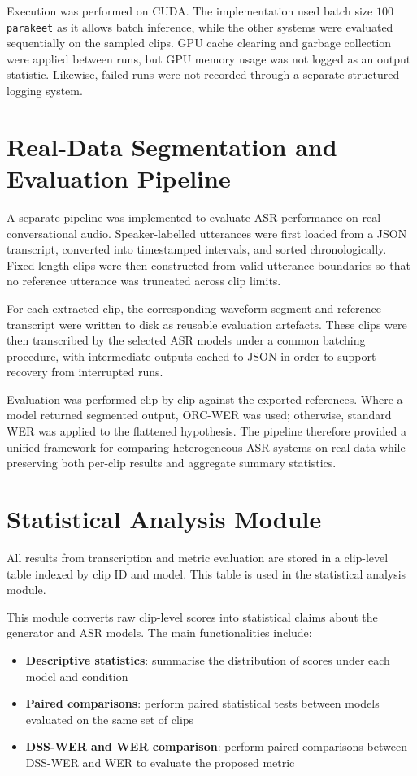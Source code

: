 Execution was performed on CUDA. The implementation used batch size $100$ \texttt{parakeet} as it allows batch inference, while the other systems were evaluated sequentially on the sampled clips. GPU cache clearing and garbage collection were applied between runs, but GPU memory usage was not logged as an output statistic. Likewise, failed runs were not recorded through a separate structured logging system.

\section{Real-Data Segmentation and Evaluation Pipeline}
\label{subsec:real_data_pipeline}

A separate pipeline was implemented to evaluate ASR performance on real conversational audio. Speaker-labelled utterances were first loaded from a JSON transcript, converted into timestamped intervals, and sorted chronologically. Fixed-length clips were then constructed from valid utterance boundaries so that no reference utterance was truncated across clip limits.

For each extracted clip, the corresponding waveform segment and reference transcript were written to disk as reusable evaluation artefacts. These clips were then transcribed by the selected ASR models under a common batching procedure, with intermediate outputs cached to JSON in order to support recovery from interrupted runs.

Evaluation was performed clip by clip against the exported references. Where a model returned segmented output, ORC-WER was used; otherwise, standard WER was applied to the flattened hypothesis. The pipeline therefore provided a unified framework for comparing heterogeneous ASR systems on real data while preserving both per-clip results and aggregate summary statistics.


\section{Statistical Analysis Module}
All results from transcription and metric evaluation are stored in a clip-level table indexed by clip ID and model. This table is used in the statistical analysis module.

This module converts raw clip-level scores into statistical claims about the generator and ASR models. The main functionalities include:
\begin{itemize}
    \item \textbf{Descriptive statistics}: summarise the distribution of scores under each model and condition
    \item \textbf{Paired comparisons}: perform paired statistical tests between models evaluated on the same set of clips
    \item \textbf{DSS-WER and WER comparison}: perform paired comparisons between DSS-WER and WER to evaluate the proposed metric
\end{itemize}


